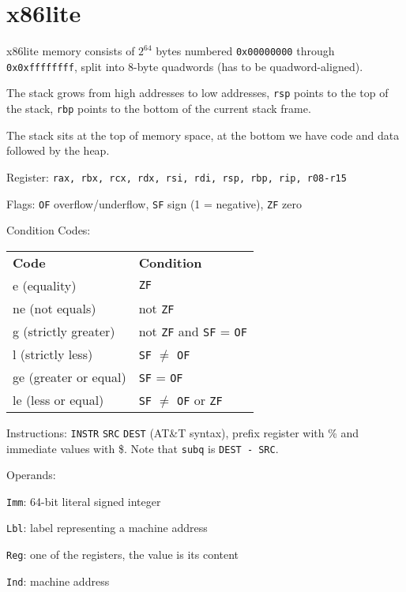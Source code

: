 \section*{x86lite}

x86lite memory consists of $2^{64}$ bytes numbered \texttt{0x00000000} through \texttt{0x0xffffffff}, split into 8-byte quadwords (has to be quadword-aligned). \medskip
	
The stack grows from high addresses to low addresses, \texttt{rsp} points to the top of the stack, \texttt{rbp} points to the bottom of the current stack frame. \medskip

The stack sits at the top of memory space, at the bottom we have code and data followed by the heap.\medskip
	
Register: \texttt{rax, rbx, rcx, rdx, rsi, rdi, rsp, rbp, rip, r08-r15}\medskip
	
Flags: \texttt{OF} overflow/underflow, \texttt{SF} sign (1 = negative), \texttt{ZF} zero \medskip

Condition Codes:
\begin{center}
	\begin{tabular}{l l}
		 \textbf{Code} & \textbf{Condition} \\
		 e (equality) & \texttt{ZF} \\
		 ne (not equals) & not \texttt{ZF} \\
		 g (strictly greater) & not \texttt{ZF} and \texttt{SF} = \texttt{OF} \\
		 l (strictly less) & \texttt{SF} $\neq$ \texttt{OF} \\
		 ge (greater or equal) & \texttt{SF} = \texttt{OF} \\
		 le (less or equal) & \texttt{SF} $\neq$ \texttt{OF} or \texttt{ZF} \\
	\end{tabular}
\end{center}
	
Instructions: \texttt{INSTR} \texttt{SRC} \texttt{DEST} (AT\&T syntax), prefix register with \% and immediate values with \$. Note that \texttt{subq} is \texttt{DEST - SRC}.\medskip
	
Operands:
\begin{compactitem}
	\item \texttt{Imm}: 64-bit literal signed integer
	\item \texttt{Lbl}: label representing a machine address
	\item \texttt{Reg}: one of the registers, the value is its content
	\item \texttt{Ind}: machine address
\end{compactitem} \medskip

